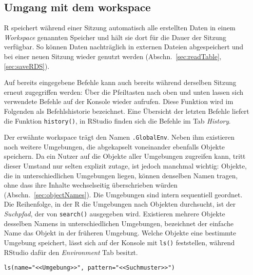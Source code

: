 \subsection{Umgang mit dem workspace}
\label{sec:workspace}

R speichert während einer Sitzung automatisch alle erstellten Daten in einem \emph{Workspace} genannten Speicher und hält sie dort für die Dauer der Sitzung verfügbar. So können Daten nachträglich in externen Dateien abgespeichert und bei einer neuen Sitzung wieder genutzt werden (Abschn.\ \ref{sec:readTable}, \ref{sec:saveRDS}).

Auf bereits eingegebene Befehle kann auch bereits während derselben Sitzung erneut zugegriffen werden: Über die Pfeiltasten nach oben und unten lassen sich verwendete Befehle auf der Konsole wieder aufrufen. Diese Funktion wird im Folgenden als Befehlshistorie bezeichnet. Eine Übersicht der letzten Befehle liefert die Funktion \lstinline!history()!, in RStudio finden sich die Befehle im Tab \emph{History}.

Der erwähnte workspace trägt den Namen  \lstinline!.GlobalEnv!. Neben ihm existieren noch weitere Umgebungen, die abgekapselt voneinander ebenfalls Objekte speichern. Da ein Nutzer auf die Objekte aller Umgebungen zugreifen kann, tritt dieser Umstand nur selten explizit zutage, ist jedoch manchmal wichtig: Objekte, die in unterschiedlichen Umgebungen liegen, können denselben Namen tragen, ohne dass ihre Inhalte wechselseitig überschrieben würden (Abschn.\ \ref{sec:objectNames}). Die Umgebungen sind intern sequentiell geordnet. Die Reihenfolge, in der R die Umgebungen nach Objekten durchsucht, ist der \emph{Suchpfad}, der von  \lstinline!search()! ausgegeben wird. Existieren mehrere Objekte desselben Namens in unterschiedlichen Umgebungen, bezeichnet der einfache Name das Objekt in der früheren Umgebung. Welche Objekte eine bestimmte Umgebung speichert, lässt sich auf der Konsole mit \lstinline!ls()! feststellen, während RStudio dafür den \emph{Environment} Tab besitzt.
\begin{lstlisting}
ls(name="<<Umgebung>>", pattern="<<Suchmuster>>")
\end{lstlisting}

